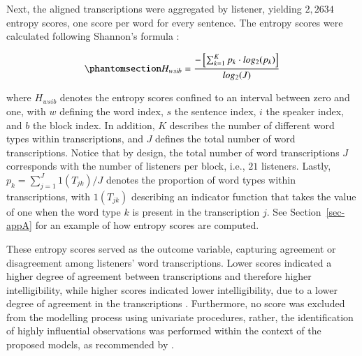 \documentclass[
  authoryear,
  preprint,
  1p]{elsarticle}
\begin{document}
Next, the aligned transcriptions were aggregated by listener, yielding
\(2,2634\) entropy scores, one score per word for every sentence. The
entropy scores were calculated following Shannon's formula
\citeyearpar{Shannon_1948}:

\begin{equation}\phantomsection\label{eq-entropy}{
H_{wsib} = \frac{ -\left[ \sum_{k=1}^{K}  p_{k} \cdot log_{2}(p_{k}) \right] }{ log_{2}(J)}
}\end{equation}

where \(H_{wsib}\) denotes the entropy scores confined to an interval
between zero and one, with \(w\) defining the word index, \(s\) the
sentence index, \(i\) the speaker index, and \(b\) the block index. In
addition, \(K\) describes the number of different word types within
transcriptions, and \(J\) defines the total number of word
transcriptions. Notice that by design, the total number of word
transcriptions \(J\) corresponds with the number of listeners per block,
i.e., \(21\) listeners. Lastly, \(p_{k} = \sum_{j=1}^{J} 1(T_{jk}) / J\)
denotes the proportion of word types within transcriptions, with
\(1(T_{jk})\) describing an indicator function that takes the value of
one when the word type \(k\) is present in the transcription \(j\). See
Section~\ref{sec-appA} for an example of how entropy scores are
computed.

These entropy scores served as the outcome variable, capturing agreement
or disagreement among listeners' word transcriptions. Lower scores
indicated a higher degree of agreement between transcriptions and
therefore higher intelligibility, while higher scores indicated lower
intelligibility, due to a lower degree of agreement in the
transcriptions \citep{Boonen_et_al_2023, Faes_et_al_2022}. Furthermore,
no score was excluded from the modelling process using univariate
procedures, rather, the identification of highly influential
observations was performed within the context of the proposed models, as
recommended by \citet{McElreath_2020}.
\end{document}

